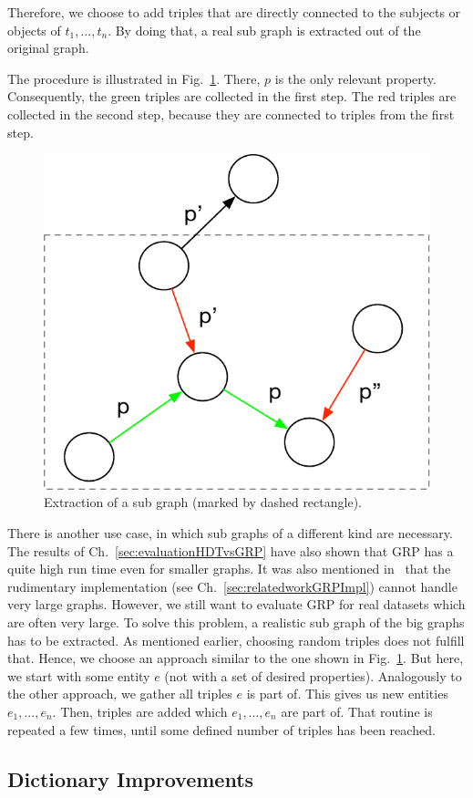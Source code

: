 Therefore, we choose to add triples that are directly connected to the subjects or objects of $t_1,...,t_n$. By doing that, a real sub graph is extracted out of the original graph.

The procedure is illustrated in Fig.~\ref{fig:subgraph}. There, $p$ is the only relevant property. Consequently, the green triples are collected in the first step. The red triples are collected in the second step, because they are connected to triples from the first step.

\begin{figure}
	\centering
	\includegraphics[width=0.4\linewidth]{figures/4_implementation/subgraph}
	\caption{Extraction of a sub graph (marked by dashed rectangle).}
	\label{fig:subgraph}
\end{figure}

There is another use case, in which sub graphs of a different kind are necessary. The results of Ch.~\ref{sec:evaluationHDTvsGRP} have also shown that GRP has a quite high run time even for smaller graphs. It was also mentioned in~\cite{maneth} that the rudimentary implementation (see Ch.~\ref{sec:relatedworkGRPImpl}) cannot handle very large graphs. However, we still want to evaluate GRP for real datasets which are often very large. To solve this problem, a realistic sub graph of the big graphs has to be extracted. As mentioned earlier, choosing random triples does not fulfill that. Hence, we choose an approach similar to the one shown in Fig.~\ref{fig:subgraph}. But here, we start with some entity $e$ (not with a set of desired properties). Analogously to the other approach, we gather all triples $e$ is part of. This gives us new entities $e_1,...,e_n$. Then, triples are added which $e_1,...,e_n$ are part of. That routine is repeated a few times, until some defined number of triples has been reached. 



\subsection{Dictionary Improvements}\label{sec:implementationDictImprovements}

